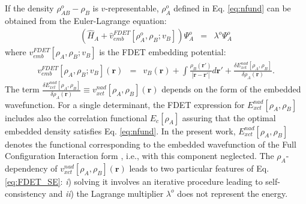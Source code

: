 \documentclass[journal=jctcce,manuscript=article]{achemso}
\begin{document}
If the density $\rho^{o}_{AB}-\rho_{B}$ is $v$-representable,  $\rho_A^{o}$ defined in Eq. \ref{eq:nfund} can be obtained from the Euler-Lagrange equation:
\begin{eqnarray}
    \left( \hat{H}_A + \hat{v}_{emb}^{{FDET}}[\rho_A^{{o}}, \rho_B; v_B] \right) \Psi_A^{{o}} &=& \lambda^{o}\Psi_A^{{o}} \label{eq:FDET_SE} 
\end{eqnarray}
where $v_{emb}^{{FDET}}[\rho_A,\rho_B; v_B]$
is the FDET embedding potential:
\begin{eqnarray}
v_{emb}^{{FDET}}[\rho_A,\rho_B; v_B](\mathbf{r}) &=& v_B(\mathbf{r}) +  \int \frac{\rho_B(\mathbf{r}')}{|\mathbf{r}-\mathbf{r}'|} d\mathbf{r}'+ \frac{\delta E_{xct}^{nad}[\rho_A,\rho_B]}{\delta\rho_A(\mathbf{r})}.
\label{eq:nFDET_embpot}  
\end{eqnarray}
The term $\frac{\delta E_{xct}^{nad}[\rho_A,\rho_B]}{\delta\rho_A(\mathbf{r})}\equiv v_{xct}^{nad}[\rho_A,\rho_B](\mathbf{r})$ depends on the form of the embedded wavefunction\cite{Wesolowski2008}.
For a single determinant, the FDET expression for $E_{xct}^{nad}[\rho_A,\rho_B]$   includes also the correlation functional $E_c[\rho_A]$  assuring that the optimal embedded density satisfies Eq. \ref{eq:nfund}. 
In the present work,  $E_{xct}^{nad}[\rho_A,\rho_B]$ denotes the functional corresponding to the embedded wavefunction of the Full Configuration Interaction form \cite{Wesolowski2008}, i.e., with this component neglected.
The $\rho_A$-dependency of  $v_{xct}^{nad}[\rho_A,\rho_B](\mathbf{r})$ leads to two 
particular features of Eq. \ref {eq:FDET_SE}: {\it i}) solving it involves an iterative procedure leading to self-consistency and {\it ii}) the Lagrange multiplier $\lambda^{o}$  does not represent the energy.  
\end{document}
